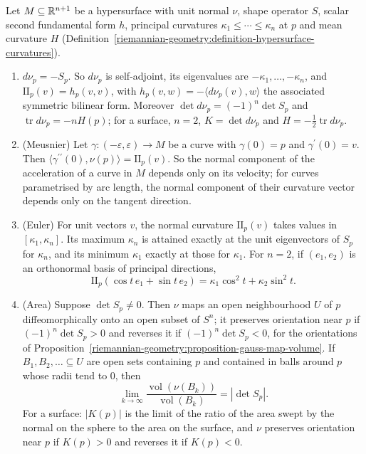\begin{proposition}\label{riemannian-geometry:proposition-gauss-map-curvatures}
Let $M \subseteq \mathbb{R}^{n+1}$ be a hypersurface with unit normal $\nu$, shape operator $S$, scalar second fundamental form $h$, principal curvatures $\kappa_1 \leq \cdots \leq \kappa_n$ at $p$ and mean
curvature $H$ (Definition~\ref{riemannian-geometry:definition-hypersurface-curvatures}).
\begin{enumerate}
\item $d\nu_p = -S_p$. So $d\nu_p$ is self-adjoint, its eigenvalues are $-\kappa_1, \ldots, -\kappa_n$, and $\mathrm{II}_p(v) = h_p(v, v)$, with $h_p(v, w) = -\langle d\nu_p(v), w\rangle$ the associated symmetric
bilinear form. Moreover $\det d\nu_p = (-1)^n\det S_p$ and $\operatorname{tr}d\nu_p = -nH(p)$; for a surface, $n = 2$, $K = \det d\nu_p$ and $H = -\frac12\operatorname{tr}d\nu_p$.
\item (Meusnier) Let $\gamma \colon (-\varepsilon, \varepsilon) \to M$ be a curve with $\gamma(0) = p$ and $\gamma^{\prime}(0) = v$. Then $\langle\gamma^{\prime\prime}(0), \nu(p)\rangle = \mathrm{II}_p(v)$. So the normal component
of the acceleration of a curve in $M$ depends only on its velocity; for curves parametrised by arc length, the normal component of their curvature vector depends only on the tangent direction.
\item (Euler) For unit vectors $v$, the normal curvature $\mathrm{II}_p(v)$ takes values in $[\kappa_1, \kappa_n]$. Its maximum $\kappa_n$ is attained exactly at the unit eigenvectors of $S_p$ for $\kappa_n$,
and its minimum $\kappa_1$ exactly at those for $\kappa_1$. For $n = 2$, if $(e_1, e_2)$ is an orthonormal basis of principal directions,
\[
\mathrm{II}_p(\cos t\,e_1 + \sin t\,e_2) = \kappa_1\cos^2t + \kappa_2\sin^2t .
\]
\item (Area) Suppose $\det S_p \neq 0$. Then $\nu$ maps an open neighbourhood $U$ of $p$ diffeomorphically onto an open subset of $S^n$; it preserves orientation near $p$ if $(-1)^n\det S_p > 0$ and reverses
it if $(-1)^n\det S_p < 0$, for the orientations of Proposition~\ref{riemannian-geometry:proposition-gauss-map-volume}. If $B_1, B_2, \ldots \subseteq U$ are open sets containing $p$ and contained in balls
around $p$ whose radii tend to $0$, then
\[
\lim_{k \to \infty}\frac{\operatorname{vol}(\nu(B_k))}{\operatorname{vol}(B_k)} = |\det S_p| .
\]
For a surface: $|K(p)|$ is the limit of the ratio of the area swept by the normal on the sphere to the area on the surface, and $\nu$ preserves orientation near $p$ if $K(p) > 0$ and reverses it if $K(p) < 0$.
\end{enumerate}
\end{proposition}

